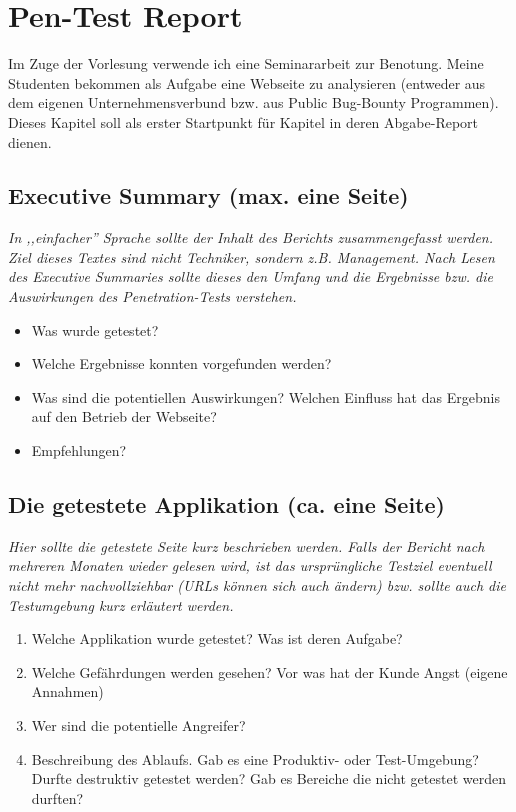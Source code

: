 \part{Pen-Test Report}

Im Zuge der Vorlesung verwende ich eine Seminararbeit zur Benotung. Meine Studenten bekommen als Aufgabe eine Webseite zu analysieren (entweder aus dem eigenen Unternehmensverbund bzw. aus Public Bug-Bounty Programmen). Dieses Kapitel soll als erster Startpunkt für Kapitel in deren Abgabe-Report dienen.

\chapter{Executive Summary (max. eine Seite)}

\textit{In ,,einfacher'' Sprache sollte der Inhalt des Berichts zusammengefasst werden. Ziel dieses Textes sind nicht Techniker, sondern z.B. Management. Nach Lesen des Executive Summaries sollte dieses den Umfang und die Ergebnisse bzw. die Auswirkungen des Penetration-Tests verstehen.}

\begin{itemize}
				\item Was wurde getestet?
				\item Welche Ergebnisse konnten vorgefunden werden?
				\item Was sind die potentiellen Auswirkungen? Welchen Einfluss hat das Ergebnis auf den Betrieb der Webseite?
				\item Empfehlungen?
\end{itemize}

\chapter{Die getestete Applikation (ca. eine Seite)}

\textit{Hier sollte die getestete Seite kurz beschrieben werden. Falls der Bericht nach mehreren Monaten wieder gelesen wird, ist das ursprüngliche Testziel eventuell nicht mehr nachvollziehbar (URLs können sich auch ändern) bzw. sollte auch die Testumgebung kurz erläutert werden.}

\begin{enumerate}
				\item Welche Applikation wurde getestet? Was ist deren Aufgabe?
				\item Welche Gefährdungen werden gesehen? Vor was hat der Kunde Angst (eigene Annahmen)
				\item Wer sind die potentielle Angreifer?
				\item Beschreibung des Ablaufs. Gab es eine Produktiv- oder Test-Umgebung? Durfte destruktiv getestet werden? Gab es Bereiche die nicht getestet werden durften?
\end{enumerate}

